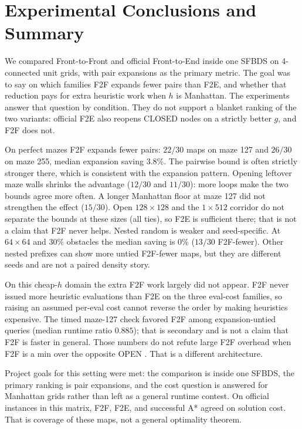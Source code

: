 \section{Experimental Conclusions and Summary}

We compared Front-to-Front and official Front-to-End inside one SFBDS on 4-connected unit grids, with pair expansions as the primary metric. The goal was to say on which families F2F expands fewer pairs than F2E, and whether that reduction pays for extra heuristic work when \(h\) is Manhattan. The experiments answer that question by condition. They do not support a blanket ranking of the two variants: official F2E also reopens CLOSED nodes on a strictly better \(g\), and F2F does not.

On perfect mazes F2F expands fewer pairs: \(22/30\) maps on maze 127 and \(26/30\) on maze 255, median expansion saving \(3.8\%\). The pairwise bound is often strictly stronger there, which is consistent with the expansion pattern. Opening leftover maze walls shrinks the advantage (\(12/30\) and \(11/30\)): more loops make the two bounds agree more often. A longer Manhattan floor at maze 127 did not strengthen the effect (\(15/30\)). Open \(128\times128\) and the \(1\times512\) corridor do not separate the bounds at these sizes (all ties), so F2E is sufficient there; that is not a claim that F2F never helps. Nested random is weaker and seed-specific. At \(64\times64\) and \(30\%\) obstacles the median saving is \(0\%\) (\(13/30\) F2F-fewer). Other nested prefixes can show more untied F2F-fewer maps, but they are different seeds and are not a paired density story.

On this cheap-\(h\) domain the extra F2F work largely did not appear. F2F never issued more heuristic evaluations than F2E on the three eval-cost families, so raising an assumed per-eval cost cannot reverse the order by making heuristics expensive. The timed maze-127 check favored F2F among expansion-untied queries (median runtime ratio \(0.885\)); that is secondary and is not a claim that F2F is faster in general. Those numbers do not refute large F2F overhead when F2F is a min over the opposite OPEN \cite{siag2023socs}. That is a different architecture.

Project goals for this setting were met: the comparison is inside one SFBDS, the primary ranking is pair expansions, and the cost question is answered for Manhattan grids rather than left as a general runtime contest. On official instances in this matrix, F2F, F2E, and successful A* agreed on solution cost. That is coverage of these maps, not a general optimality theorem.

